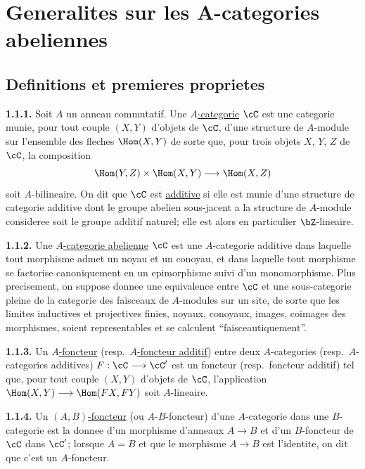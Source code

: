 \tableofcontents

\newpage

\section{Generalites sur les A-categories abeliennes}

\subsection{Definitions et premieres proprietes}

\medskip
\noindent\textbf{1.1.1.} Soit $A$ un anneau commutatif. Une \underline{$A$-categorie} $\cC$ est une categorie munie, pour tout couple $(X,Y)$ d'objets de $\cC$, d'une structure de $A$-module sur l'ensemble des fleches $\Hom(X,Y)$ de sorte que, pour trois objets $X$, $Y$, $Z$ de $\cC$, la composition
\[
\Hom(Y,Z) \times \Hom(X,Y) \longrightarrow \Hom(X,Z)
\]
soit $A$-bilineaire. On dit que $\cC$ est \underline{additive} si elle est munie d'une structure de categorie additive dont le groupe abelien sous-jacent a la structure de $A$-module consideree soit le groupe additif naturel; elle est alors en particulier $\bZ$-lineaire.

\medskip
\noindent\textbf{1.1.2.} Une \underline{$A$-categorie abelienne} $\cC$ est une $A$-categorie additive dans laquelle tout morphisme admet un noyau et un conoyau, et dans laquelle tout morphisme se factorise canoniquement en un epimorphisme suivi d'un monomorphisme. Plus precisement, on suppose donnee une equivalence entre $\cC$ et une sous-categorie pleine de la categorie des faisceaux de $A$-modules sur un site, de sorte que les limites inductives et projectives finies, noyaux, conoyaux, images, coimages des morphismes, soient representables et se calculent ``faisceautiquement''.

\medskip
\noindent\textbf{1.1.3.} Un \underline{$A$-foncteur} (resp.\ \underline{$A$-foncteur additif}) entre deux $A$-categories (resp.\ $A$-categories additives) $F : \cC \longrightarrow \cC'$ est un foncteur (resp.\ foncteur additif) tel que, pour tout couple $(X,Y)$ d'objets de $\cC$, l'application $\Hom(X,Y) \longrightarrow \Hom(FX,FY)$ soit $A$-lineaire.

\medskip
\noindent\textbf{1.1.4.} Un \underline{$(A,B)$-foncteur} (ou $A$-$B$-foncteur) d'une $A$-categorie dans une $B$-categorie est la donnee d'un morphisme d'anneaux $A \longrightarrow B$ et d'un $B$-foncteur de $\cC$ dans $\cC'$; lorsque $A=B$ et que le morphisme $A \longrightarrow B$ est l'identite, on dit que c'est un $A$-foncteur.

